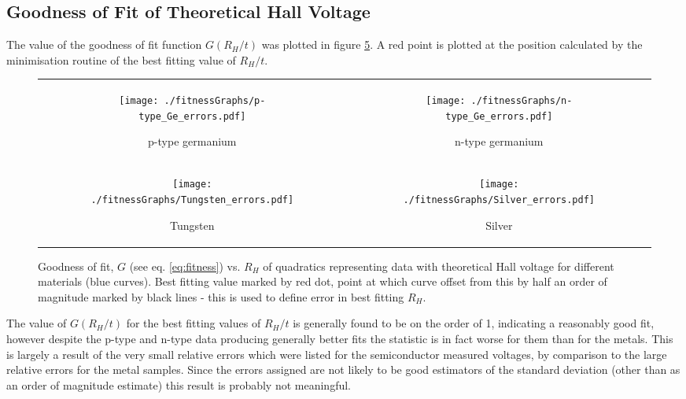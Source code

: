 \documentclass[a4paper]{article}
\begin{document}
		\subsection{Goodness of Fit of Theoretical Hall Voltage}
			The value of the goodness of fit function $G(R_H/t)$ was plotted in figure \ref{fig:fitnessGraphs}. A red point is plotted at the position calculated by the minimisation routine of the best fitting value of $R_H/t$.
			
			\begin{figure}[t]
				\centering
				\begin{tabular}{c|c}
					\begin{subfigure}[t]{0.45\textwidth}
						\centering
						\texttt{[image: ./fitnessGraphs/p-type\_Ge\_errors.pdf]}
						\caption{p-type germanium}
						\label{fig:pTypeGeErrors}
					\end{subfigure}
					&
					\begin{subfigure}[t]{0.45\textwidth}
						\centering
						\texttt{[image: ./fitnessGraphs/n-type\_Ge\_errors.pdf]}
						\caption{n-type germanium}
						\label{fig:nTypeGeErrors}
					\end{subfigure}
					\\
					\begin{subfigure}[t]{0.45\textwidth}
						\centering
						\texttt{[image: ./fitnessGraphs/Tungsten\_errors.pdf]}
						\caption{Tungsten}
						\label{fig:tungstenErrors}
					\end{subfigure}
					&
					\begin{subfigure}[t]{0.45\textwidth}
						\centering
						\texttt{[image: ./fitnessGraphs/Silver\_errors.pdf]}
						\caption{Silver}
						\label{fig:silverErrors}
					\end{subfigure}
				\end{tabular}
				\caption{Goodness of fit, $G$ (see eq. \ref{eq:fitness}) vs. $R_H$ of quadratics representing data with theoretical Hall voltage for different materials (blue curves). Best fitting value marked by red dot, point at which curve offset from this by half an order of magnitude marked by black lines - this is used to define error in best fitting $R_H$.}
				\label{fig:fitnessGraphs}
			\end{figure}
			
			The value of $G(R_H/t)$ for the best fitting values of $R_H/t$ is generally found to be on the order of 1, indicating a reasonably good fit, however despite the p-type and n-type data producing generally better fits the statistic is in fact worse for them than for the metals. This is largely a result of the very small relative errors which were listed for the semiconductor measured voltages, by comparison to the large relative errors for the metal samples. Since the errors assigned are not likely to be good estimators of the standard deviation (other than as an order of magnitude estimate) this result is probably not meaningful.
			
\end{document}
